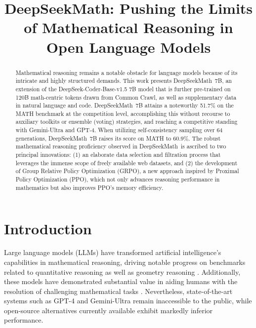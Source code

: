 \title{DeepSeekMath: Pushing the Limits of Mathematical Reasoning in Open Language Models}

\begin{abstract}
Mathematical reasoning remains a notable obstacle for language models because of its intricate and highly structured demands. This work presents DeepSeekMath~7B, an extension of the DeepSeek-Coder-Base-v1.5 7B model that is further pre-trained on 120B math-centric tokens drawn from Common Crawl, as well as supplementary data in natural language and code. DeepSeekMath~7B attains a noteworthy 51.7\% on the MATH benchmark at the competition level, accomplishing this without recourse to auxiliary toolkits or ensemble (voting) strategies, and reaching a competitive standing with Gemini-Ultra and GPT-4. When utilizing self-consistency sampling over 64 generations, DeepSeekMath~7B raises its score on MATH to 60.9\%. The robust mathematical reasoning proficiency observed in DeepSeekMath~is ascribed to two principal innovations: (1) an elaborate data selection and filtration process that leverages the immense scope of freely available web datasets, and (2) the development of Group Relative Policy Optimization (GRPO), a new approach inspired by Proximal Policy Optimization (PPO), which not only advances reasoning performance in mathematics but also improves PPO's memory efficiency.
\end{abstract}

\section{Introduction}

Large language models (LLMs) have transformed artificial intelligence's capabilities in mathematical reasoning, driving notable progress on benchmarks related to quantitative reasoning \citep{MATH} as well as geometry reasoning \citep{trinh2024solving}. Additionally, these models have demonstrated substantial value in aiding humans with the resolution of challenging mathematical tasks \citep{tao}. Nevertheless, state-of-the-art systems such as GPT-4 \citep{gpt4} and Gemini-Ultra \citep{gemini} remain inaccessible to the public, while open-source alternatives currently available exhibit markedly inferior performance.


